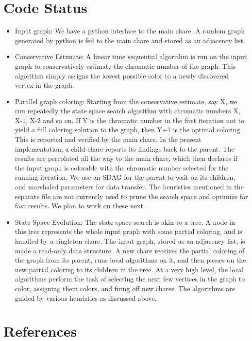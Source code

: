 \documentclass[10pt,twoside]{article}
\begin{document}
\section{Code Status}
\begin{itemize}

  \item Input graph: We have a python interface to the main chare. A random
    graph generated by python is fed to the main chare and stored as an
    adjacency list.  
    
  \item Conservative Estimate: A linear time sequential algorithm
    is run on the input graph to conservatively estimate the chromatic number
    of the graph. This algorithm simply assigns the lowest possible color to a
    newly discovered vertex in the graph.  
    
  \item Parallel graph coloring:  Starting from the conservative estimate, say
  X, we run repeatedly the state space search algorithm with chromatic numbers
  X, X-1, X-2 and so on. If Y is the chromatic number in the first iteration
  not to yield a full coloring solution to the graph, then Y+1 is the optimal
  coloring. This is reported and verified by the main chare.  In the present
  implementation, a child chare reports its findings back to the parent. The
  results are percolated all the way to the main chare, which then declares if
  the input graph is colorable with the chromatic number selected for the
  running iteration. We use an SDAG for the parent to wait on its children, and
  marshaled parameters for data transfer. The heuristics mentioned in the
  separate file are not currently used to prune the search space and optimize
  for fast results. We plan to work on these next.  
    
  \item  State Space Evolution: The state space search is akin to a tree. A
    node in this tree represents the whole input graph with some partial
    coloring, and is handled by a singleton chare. The input graph, stored as
    an adjacency list, is made a read-only data structure. A new chare receives
    the partial coloring of the graph from its parent, runs local algorithms on
    it, and then passes on the new partial coloring to its children in the
    tree. At a very high level, the local algorithms perform the task of
    selecting the next few vertices in the graph to color, assigning them
    colors, and firing off new chares. The algorithms are guided by various
    heuristics as discussed above.

\end{itemize}

\section{References}

\nocite{*}

\end{document}

